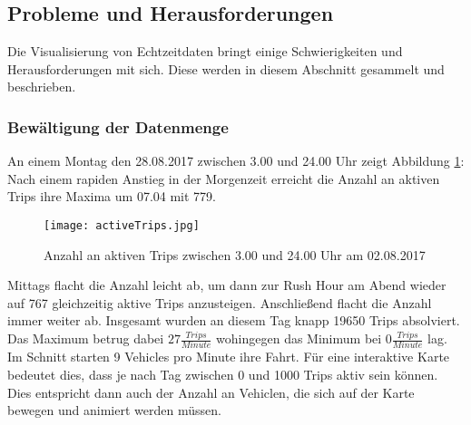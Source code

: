   
\subsection{Probleme und Herausforderungen}
\label{sub:probleme_und_herausforderungen}

  Die Visualisierung von Echtzeitdaten bringt einige Schwierigkeiten und Herausforderungen mit sich. Diese werden in diesem Abschnitt gesammelt und beschrieben.

  \subsubsection{Bewältigung der Datenmenge}
  \label{ssub:bewältigung_der_datenmenge}
    An einem Montag den 28.08.2017 zwischen 3.00 und 24.00 Uhr zeigt Abbildung \ref{fig:activeTrips}: Nach einem rapiden Anstieg in der Morgenzeit erreicht die Anzahl an aktiven Trips ihre Maxima um 07.04 mit 779. 

    \begin{figure}[ht]
      \begin{center}
        \texttt{[image: activeTrips.jpg]}
        \caption{Anzahl an aktiven Trips zwischen 3.00 und 24.00 Uhr am 02.08.2017}
        \label{fig:activeTrips}
      \end{center}
    \end{figure}

    Mittags flacht die Anzahl leicht ab, um dann zur Rush Hour am Abend wieder auf 767 gleichzeitig aktive Trips anzusteigen. Anschließend flacht die Anzahl immer weiter ab. Insgesamt wurden an diesem Tag knapp 19650 Trips absolviert. Das Maximum betrug dabei $27 \frac{Trips}{Minute}$ wohingegen das Minimum bei $0 \frac{Trips}{Minute}$ lag. Im Schnitt starten 9 Vehicles pro Minute ihre Fahrt. Für eine interaktive Karte bedeutet dies, dass je nach Tag zwischen 0 und 1000 Trips aktiv sein können. Dies entspricht dann auch der Anzahl an Vehiclen, die sich auf der Karte bewegen und animiert werden müssen. 
